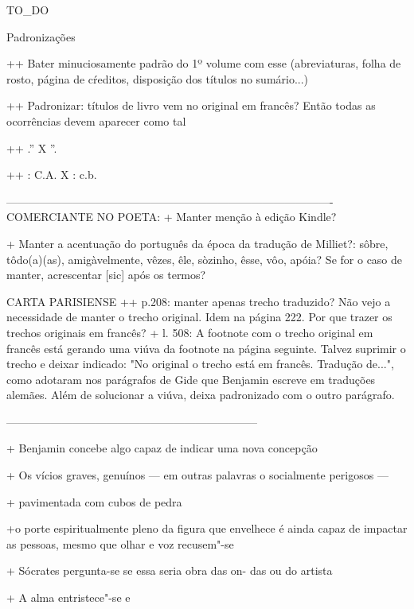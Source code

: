 TO_DO

Padronizações


++ Bater minuciosamente padrão do 1º volume com esse (abreviaturas, folha de rosto, página de cŕeditos, disposição dos títulos no sumário...)

++ Padronizar: títulos de livro vem no original em francês? Então todas as ocorrências devem aparecer como tal

++ .'' X ''.

++ : C.A. X : c.b.

----------------------------------------------------------------------------------------
COMERCIANTE NO POETA:
+ Manter menção à edição Kindle?


+ Manter a acentuação do português da época da tradução de Milliet?: sôbre, tôdo(a)(as), amigàvelmente, vêzes, êle, sòzinho, êsse, vôo, apóia? Se for o caso de manter, acrescentar [sic] após os termos?

CARTA PARISIENSE ++ p.208: manter apenas trecho traduzido? Não vejo a necessidade de manter o trecho original. Idem na página 222. Por que trazer os trechos originais em francês? + l. 508: A footnote com o trecho original em francês está gerando uma viúva da footnote na página seguinte. Talvez suprimir o trecho e deixar indicado: "No original o trecho está em francês. Tradução de...", como adotaram nos parágrafos de Gide que Benjamin escreve em traduções alemães. Além de solucionar a viúva, deixa padronizado com o outro parágrafo.


--------------------------------------------------------------------

+ Benjamin concebe algo capaz de indicar uma nova concepção


+ Os vícios graves, genuínos --- em outras palavras o
socialmente perigosos ---

+ pavimentada com cubos de pedra

+o porte espiritualmente pleno da figura que envelhece é ainda capaz de
impactar as pessoas, mesmo que olhar e voz recusem"-se

+ Sócrates pergunta-se se essa seria obra das on-
das ou do artista

+ A alma entristece"-se e